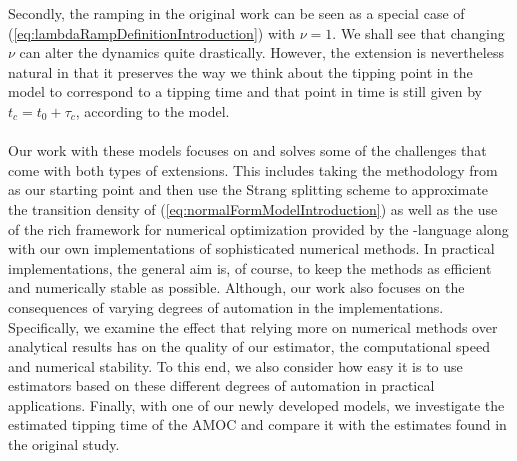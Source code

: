 Secondly, the ramping in the original work \cite[equation (2)]{Ditlevsen2023} can be seen as a special case of (\ref{eq:lambdaRampDefinitionIntroduction}) with $\nu = 1$. We shall see that changing $\nu$ can alter the dynamics quite drastically. However, the extension is nevertheless natural in that it preserves the way we think about the tipping point in the model to correspond to a tipping time and that point in time is still given by $t_c = t_0 + \tau_c$, according to the model.\\\\
Our work with these models focuses on and solves some of the challenges that come with both types of extensions. This includes taking the methodology from \cite{Ditlevsen2023} as our starting point and then use the Strang splitting scheme\cite{SplittingSchemes} to approximate the transition density of (\ref{eq:normalFormModelIntroduction}) as well as the use of the rich framework for numerical optimization provided by the -language along with our own implementations of sophisticated numerical methods. \cite{Rlang} In practical implementations, the general aim is, of course, to keep the methods as efficient and numerically stable as possible. Although, our work also focuses on the consequences of varying degrees of automation in the implementations. Specifically, we examine the effect that relying more on numerical methods over analytical results has on the quality of our estimator, the computational speed and numerical stability. To this end, we also consider how easy it is to use estimators based on these different degrees of automation in practical applications. Finally, with one of our newly developed models, we investigate the estimated tipping time of the AMOC and compare it with the estimates found in the original study.
